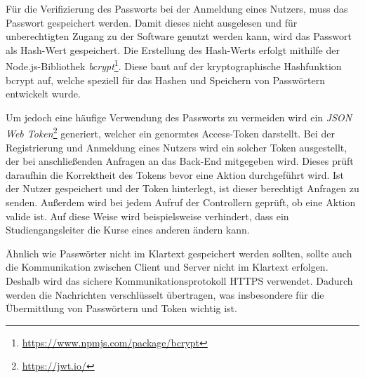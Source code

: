 Für die Verifizierung des Passworts bei der Anmeldung eines Nutzers, muss das Passwort gespeichert werden.
Damit dieses nicht ausgelesen und für unberechtigten Zugang zu der Software genutzt werden kann, wird das Passwort als Hash-Wert gespeichert.
Die Erstellung des Hash-Werts erfolgt mithilfe der Node.js-Bibliothek \textit{bcrypt}\footnote{\url{https://www.npmjs.com/package/bcrypt}}.
Diese baut auf der kryptographische Hashfunktion bcrypt auf, welche speziell für das Hashen und Speichern von Passwörtern entwickelt wurde.

Um jedoch eine häufige Verwendung des Passworts zu vermeiden wird ein \textit{JSON Web Token}\footnote{\url{https://jwt.io/}} generiert, welcher ein genormtes Access-Token darstellt.
Bei der Registrierung und Anmeldung eines Nutzers wird ein solcher Token ausgestellt, der bei anschließenden Anfragen an das Back-End mitgegeben wird.
Dieses prüft daraufhin die Korrektheit des Tokens bevor eine Aktion durchgeführt wird.
Ist der Nutzer gespeichert und der Token hinterlegt, ist dieser berechtigt Anfragen zu senden.
Außerdem wird bei jedem Aufruf der Controllern geprüft, ob eine Aktion valide ist.
Auf diese Weise wird beispielsweise verhindert, dass ein Studiengangsleiter die Kurse eines anderen ändern kann. 

Ähnlich wie Passwörter nicht im Klartext gespeichert werden sollten, sollte auch die Kommunikation zwischen Client und Server nicht im Klartext erfolgen.
Deshalb wird das sichere Kommunikationsprotokoll \acs{HTTPS} verwendet.
Dadurch werden die Nachrichten verschlüsselt übertragen, was insbesondere für die Übermittlung von Passwörtern und Token wichtig ist. 